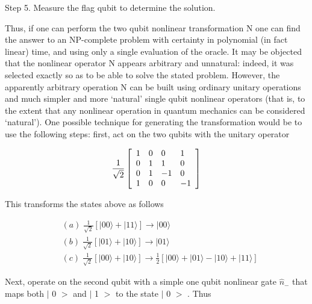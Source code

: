 \documentclass{article}
\begin{document}
Step 5. Measure the flag qubit to determine the solution.

Thus, if one can perform the two qubit nonlinear transformation N one can find
the answer to an NP-complete problem with certainty in polynomial (in fact
linear) time, and using only a single evaluation of the oracle. It may be
objected that the nonlinear operator N appears arbitrary and unnatural:
indeed, it was selected exactly so as to be able to solve the stated problem.
However, the apparently arbitrary operation N can be built using ordinary
unitary operations and much simpler and more `natural' single qubit nonlinear
operators (that is, to the extent that any nonlinear operation in quantum
mechanics can be considered `natural'). One possible technique for generating
the transformation would be to use the following steps: first, act on the two
qubits with the unitary operator%

\begin{equation}
\frac{1}{\sqrt{2}}\left[
\begin{array}
[c]{llll}%
1 & 0 & 0 & 1\\
0 & 1 & 1 & 0\\
0 & 1 & -1 & 0\\
1 & 0 & 0 & -1
\end{array}
\right]
\end{equation}

This transforms the states above as follows%

\begin{align}
&  (a)\;\frac{1}{\sqrt{2}}\left[  |00\rangle+|11\rangle\right]
\longrightarrow|00\rangle\nonumber\\
&  (b)\;\frac{1}{\sqrt{2}}\left[  |01\rangle+|10\rangle\right]
\longrightarrow|01\rangle\\
&  (c)\;\frac{1}{\sqrt{2}}\left[  |00\rangle+|10\rangle\right]
\longrightarrow\frac{1}{2}\left[  |00\rangle+|01\rangle-|10\rangle
+|11\rangle\right] \nonumber
\end{align}

Next, operate on the second qubit with a simple one qubit nonlinear gate
$\widehat{n}_{-}$ that maps both
$\vert$%
0%
$>$%
and
$\vert$%
1%
$>$%
to the state
$\vert$%
0%
$>$%
. Thus%
\end{document}
